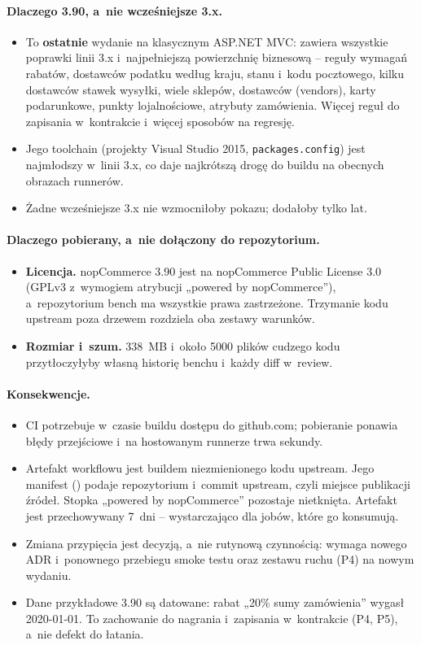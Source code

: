 \paragraph{Dlaczego 3.90, a~nie wcześniejsze 3.x.}
\begin{itemize}
  \item To \textbf{ostatnie} wydanie na klasycznym ASP.NET MVC: zawiera wszystkie
    poprawki linii 3.x i~najpełniejszą powierzchnię biznesową -- reguły wymagań rabatów,
    dostawców podatku według kraju, stanu i~kodu pocztowego, kilku dostawców stawek
    wysyłki, wiele sklepów, dostawców (vendors), karty podarunkowe, punkty lojalnościowe,
    atrybuty zamówienia. Więcej reguł do zapisania w~kontrakcie i~więcej sposobów na
    regresję.
  \item Jego toolchain (projekty Visual Studio 2015, \texttt{packages.config}) jest
    najmłodszy w~linii 3.x, co daje najkrótszą drogę do buildu na obecnych obrazach
    runnerów.
  \item Żadne wcześniejsze 3.x nie wzmocniłoby pokazu; dodałoby tylko lat.
\end{itemize}

\paragraph{Dlaczego pobierany, a~nie dołączony do repozytorium.}
\begin{itemize}
  \item \textbf{Licencja.} nopCommerce 3.90 jest na nopCommerce Public License 3.0 (GPLv3
    z~wymogiem atrybucji „powered by nopCommerce”), a~repozytorium bench ma wszystkie prawa
    zastrzeżone. Trzymanie kodu upstream poza drzewem rozdziela oba zestawy warunków.
  \item \textbf{Rozmiar i~szum.} 338~MB i~około 5000 plików cudzego kodu przytłoczyłyby
    własną historię benchu i~każdy diff w~review.
\end{itemize}

\paragraph{Konsekwencje.}
\begin{itemize}
  \item CI potrzebuje w~czasie buildu dostępu do github.com; pobieranie ponawia błędy
    przejściowe i~na hostowanym runnerze trwa sekundy.
  \item Artefakt workflowu  jest buildem niezmienionego kodu upstream.
    Jego manifest () podaje repozytorium i~commit upstream, czyli
    miejsce publikacji źródeł. Stopka „powered by nopCommerce” pozostaje nietknięta.
    Artefakt jest przechowywany 7~dni -- wystarczająco dla jobów, które go konsumują.
  \item Zmiana przypięcia jest decyzją, a~nie rutynową czynnością: wymaga nowego ADR
    i~ponownego przebiegu smoke testu oraz zestawu ruchu (P4) na nowym wydaniu.
  \item Dane przykładowe 3.90 są datowane: rabat „20\% sumy zamówienia” wygasł
    2020-01-01. To zachowanie do nagrania i~zapisania w~kontrakcie (P4, P5), a~nie defekt
    do łatania.
\end{itemize}

